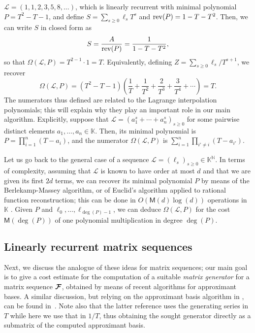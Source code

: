 \documentclass[12pt]{article}
\newcommand{\var}{T} %
\newcommand{\mat}[1]{\bm{\MakeUppercase{#1}}} %
\newcommand{\seq}{\mat{\mathcal{F}}} %
\newcommand{\genseries}{Z}
\newcommand{\minpoly}{P}
\def\M {\ensuremath{\mathsf{M}}}
\def\N {\ensuremath{\mathbb{N}}}
\def\K{\mathbb{K}}
\def\K {\ensuremath{\mathbb{K}}}
\begin{document}
$\mathcal{L} = (1,1,2,3,5,8,\dots)$, which is linearly recurrent with minimal
polynomial $P=T^2-T-1$, and define $S= \sum_{s\ge 0} \ell_{s} T^s$ and
${\rm rev}(P) = 1-T-T^2$. Then, we can write $S$ in closed form as
$$S = \frac{A}{{\rm rev}(P)} = \frac{1}{1-T-T^2},$$
so that $\Omega(\mathcal{L},P)=T^{2-1} \cdot 1=T$. Equivalently, defining
$\genseries = \sum_{s\ge0} \ell_{s}/T^{s+1}$, we recover 
\[
  \Omega(\mathcal{L},P) = (T^2-T-1)\left (\frac 1T +\frac 1{T^2} + \frac
  2{T^3} + \frac 3{T^4} + \cdots \right ) =T.
\]
The numerators thus defined are related to the Lagrange interpolation
polynomials; this will explain why they play an important role in our main
algorithm. Explicitly, suppose that $\mathcal{L} = (a_1^s + \cdots + a_n^s)_{s
\ge 0}$ for some pairwise distinct elements $a_1,\dots,a_n \in \K$. Then, its
minimal polynomial is $\minpoly=\prod_{i=1}^n (T-a_i)$, and the numerator
 $\Omega(\mathcal{L}, P)$ is  $ \sum_{i=1}^n \prod_{i'\ne i} (T-a_{i'})$.

Let us go back to the general case of a sequence $\mathcal{L}
=(\ell_s)_{s\ge0}\in\K^\N$.  In terms of complexity, assuming that
$\mathcal{L}$ is known to have order at most $d$ and that we are given its
first $2d$ terms, we can recover its minimal polynomial $P$ by means of the
Berlekamp-Massey algorithm, or of Euclid's algorithm applied to rational
function reconstruction; this can be done in $O(\M(d)\log(d))$ operations in
$\K$ \cite{BrGuYu80}. Given $P$ and $\ell_0,\dots,\ell_{\deg(P)-1}$, we can
deduce $\Omega(\mathcal{L},P)$ for the cost $\M(\deg(P))$ of one polynomial
multiplication in degree $\deg(P)$.



\subsection{Linearly recurrent matrix sequences}\label{section:matrix_seq}

Next, we discuss the analogue of these ideas for matrix sequences; our main
goal is to give a cost estimate for the computation of a suitable {\em matrix
generator} for a matrix sequence $\seq$, obtained by means of recent algorithms
for approximant bases. A similar discussion, but relying on the approximant
basis algorithm in \cite{BecLab94}, can be found in~\cite[Chapter~4]{Turner02}.
Note also that the latter reference uses the generating series in $\var$ while
here we use that in $1/\var$, thus obtaining the sought generator directly as a
submatrix of the computed approximant basis.
\end{document}
